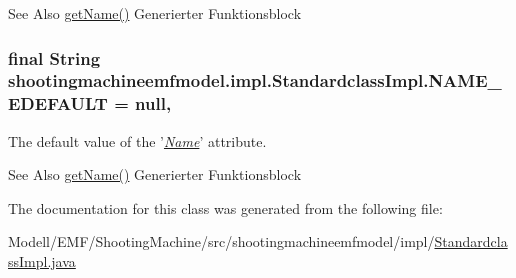 \begin{DoxySeeAlso}{See Also}
\hyperlink{classshootingmachineemfmodel_1_1impl_1_1_standardclass_impl_adfab6dbafe989bbcb5310c704caa683b}{get\-Name()} Generierter Funktionsblock  
\end{DoxySeeAlso}
\hypertarget{classshootingmachineemfmodel_1_1impl_1_1_standardclass_impl_a9b5409548f5c6e9e0919e4dc6c0d0842}{
\subsubsection[{N\-A\-M\-E\-\_\-\-E\-D\-E\-F\-A\-U\-L\-T}]{\setlength{\rightskip}{0pt plus 5cm}final String shootingmachineemfmodel.\-impl.\-Standardclass\-Impl.\-N\-A\-M\-E\-\_\-\-E\-D\-E\-F\-A\-U\-L\-T = null\hspace{0.3cm}{\ttfamily [static]}, {\ttfamily [protected]}}}\label{classshootingmachineemfmodel_1_1impl_1_1_standardclass_impl_a9b5409548f5c6e9e0919e4dc6c0d0842}
The default value of the '\hyperlink{classshootingmachineemfmodel_1_1impl_1_1_standardclass_impl_adfab6dbafe989bbcb5310c704caa683b}{{\itshape Name}}' attribute.

\begin{DoxySeeAlso}{See Also}
\hyperlink{classshootingmachineemfmodel_1_1impl_1_1_standardclass_impl_adfab6dbafe989bbcb5310c704caa683b}{get\-Name()} Generierter Funktionsblock  
\end{DoxySeeAlso}


The documentation for this class was generated from the following file\-:\begin{DoxyCompactItemize}
\item 
Modell/\-E\-M\-F/\-Shooting\-Machine/src/shootingmachineemfmodel/impl/\hyperlink{_standardclass_impl_8java}{Standardclass\-Impl.\-java}\end{DoxyCompactItemize}
